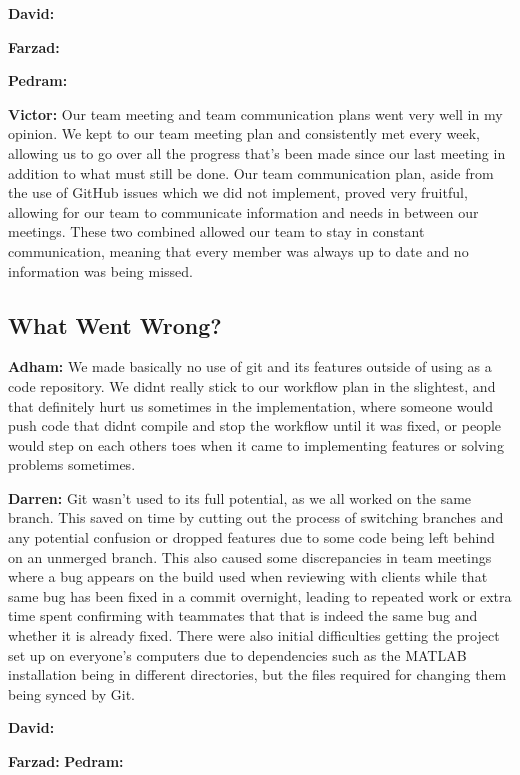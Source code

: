 \documentclass{article}
\begin{document}
\textbf{David:}

\textbf{Farzad:}

\textbf{Pedram:}

\textbf{Victor:} Our team meeting and team communication plans went very well in my opinion. We kept to our team meeting plan and consistently met every week, 
allowing us to go over all the progress that's been made since our last meeting in addition to what must still be done. Our team communication plan, aside from the use of 
GitHub issues which we did not implement, proved very fruitful, allowing for our team to communicate information and needs in between our meetings. These two combined allowed 
our team to stay in constant communication, meaning that every member was always up to date and no information was being missed.

\subsection{What Went Wrong?}

\textbf{Adham:} We made basically no use of git and its features outside of using as a code repository. We didnt really stick to our workflow plan in the slightest, and that
definitely hurt us sometimes in the implementation, where someone would push code that didnt compile and stop the workflow until it was fixed, or people would step on each others
toes when it came to implementing features or solving problems sometimes.

\textbf{Darren:} Git wasn't used to its full potential, as we all worked on the same branch. This saved on time by cutting out the process of switching branches and any 
potential confusion or dropped features due to some code being left behind on an unmerged branch. This also caused some discrepancies in team meetings where a bug appears
on the build used when reviewing with clients while that same bug has been fixed in a commit overnight, leading to repeated work or extra time spent confirming with teammates
that that is indeed the same bug and whether it is already fixed. There were also initial difficulties getting the project set up on everyone's computers due to dependencies 
such as the MATLAB installation being in different directories, but the files required for changing them being synced by Git.

\textbf{David:}

\textbf{Farzad:}
\textbf{Pedram:}
\end{document}

